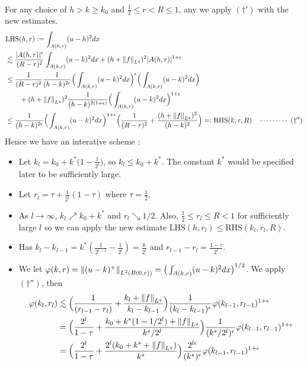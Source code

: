 \documentclass[12pt,a4paper]{article}
\newenvironment{proof}
{\begin{changemargin}{0.5cm}{0.5cm} 
	}%
	{\end{changemargin}
}
\newenvironment{p}
{\begin{proof} 
	}%
	{\end{proof}
}
\begin{document}
\begin{p}
\begin{align*}
\end{align*}
For any choice of $h> k \geq k_0$ and $\frac{1}{2} \leq r < R \leq 1$, any we apply $(\dagger')$ with the new estimates.
\begin{align*}
&\text{LHS}(h,r) := \int_{A(h,r)} (u-h)^2 dx \\
&\lesssim \frac{|A(h,r)|^{\epsilon}}{(R-r)^2} \int_{A(k,r)} (u-k)^2 dx + (h + \snorms{f}{L^q})^2 |A(h,r)|^{1+ \epsilon} \\
&\leq \frac{1}{(R-r)^2} \frac{1}{(h-k)^{2\epsilon}}\Big( \int_{A(k,r) } (u-k)^2 dx \Big)^{\epsilon} \Big( \int_{A(k,r)} (u-k)^2 dx \Big) \\
& \quad \quad + (h + \snorms{f}{L^q})^2 \frac{1}{(h-k)^{2(1+\epsilon)}} \Big( \int_{A(k,r)} (u-k)^2 dx \Big)^{1+\epsilon} \\
& \leq \frac{1}{(h-k)^{2\epsilon}} \Big( \int_{A(k,r)} (u-k)^2 dx \Big)^{1+\epsilon} \Big( \frac{1}{(R-r)^2} + \frac{(h+ \snorms{f}{L^q})^2}{(h-k)^2} \Big) =: \text{RHS}(k,r,R) \call{\dagger''}
\end{align*}
Hence we have an interative scheme :
\begin{itemize}
\item Let $k_l = k_0 + k^* \big(1- \frac{1}{2^l}\big)$, so $k_l \leq k_0 + k^*$. The constant $k^*$ would be specified later to be sufficiently large.
\item Let $r_l = \tau + \frac{1}{2^l}(1-\tau)$ where $\tau = \frac{1}{2}$.
\item As $l\rightarrow \infty$, $k_l \nearrow k_0 + k^*$ and $r_l \searrow 1/2$. Also, $\frac{1}{2} \leq r_l \leq R < 1$ for sufficiently large $l$ so we can apply the new estimate $\text{LHS}(h,r_l) \leq \text{RHS}(k_l,r_l,R)$.
\item Has $k_l - k_{l-1} = k^* (\frac{1}{2^{l-1}} - \frac{1}{2^l}) = \frac{k}{2^l}$ and $r_{l-1} - r_l = \frac{1-\tau}{2^l}$.
\item We let $\varphi(k,r) = \snorms{(u-k)^+}{L^2(B(0,r))} = \big( \int_{A(k,r)}(u-k)^2 dx \big)^{1/2}$. We apply $(\dagger'')$, then
\begin{align*}
\varphi(k_l, r_l) &\lesssim \Big( \frac{1}{(r_{l-1} - r_l)} + \frac{k_l + \snorms{f}{L^q}}{k_l - k_{l-1}} \Big) \frac{1}{(k_l - k_{l-1})^{\epsilon}} \varphi(k_{l-1}, r_{l-1})^{1+\epsilon} \\
&= \Big( \frac{2^l}{1-\tau} + \frac{k_0 + k^* (1- 1/2^l) + \snorms{f}{L^q}}{k^* / 2^l} \Big) \frac{1}{(k^*/2^l)^{\epsilon}} \varphi(k_{l-1}, r_{l-1})^{1+\epsilon} \\
&= \Big(\frac{2^l}{1- \tau} + \frac{2^l (k_0 + k^* + \snorms{f}{L^q})}{k^*}\Big) \frac{2^{l\epsilon}}{(k^*)^{\epsilon}} \varphi(k_{l-1} , r_{l-1})^{1+\epsilon} \\

\end{align*}
\end{itemize}
\end{p}
\end{document}
